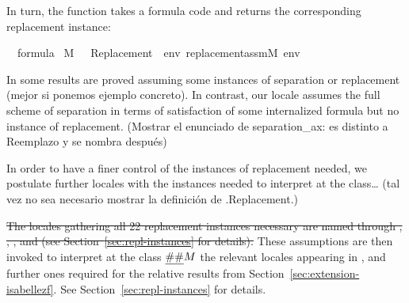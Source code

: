 In turn, the  function
takes a formula code and returns the corresponding replacement
instance:
\begin{isabelle}
{\isasymphi}\ {\isasymin}\ formula\ {\isasymLongrightarrow}\isanewline
{\isacharparenleft}{\kern0pt}M{\isacharcomma}{\kern0pt}\ {\isacharbrackleft}{\kern0pt}{\isacharbrackright}{\kern0pt}\ {\isasymTurnstile}\ {\isasymcdot}Replacement{\isacharparenleft}{\kern0pt}{\isasymphi}{\isacharparenright}{\kern0pt}{\isasymcdot}{\isacharparenright}{\kern0pt}\ {\isasymlongleftrightarrow}\ {\isacharparenleft}{\kern0pt}{\isasymforall}env{\isachardot}{\kern0pt}\ replacement{\isacharunderscore}{\kern0pt}assm{\isacharparenleft}{\kern0pt}M{\isacharcomma}{\kern0pt}\ env{\isacharcomma}{\kern0pt}\ {\isasymphi}{\isacharparenright}{\kern0pt}{\isacharparenright}
\end{isabelle}

In  some results are proved assuming some instances of
separation or replacement (mejor si ponemos ejemplo concreto). In contrast,
our locale  assumes the full scheme of separation in terms
of satisfaction of some internalized formula but no instance of replacement. (Mostrar el enunciado de separation\_ax:
es distinto a Reemplazo y se nombra después)

In order to have a finer control of the instances of replacement needed,
we postulate further locales with the instances needed to interpret at
the class\dots
(tal vez no sea necesario mostrar la definición de .Replacement.)

%

\sout{The locales gathering all 22 replacement instances necessary are named
 through ,
,
, and
 (see
Section~\ref{sec:repl-instances} for details).}
These assumptions are then invoked to interpret at the class
$\isa{\#\#} M$ the relevant locales appearing in
, and further ones required for the relative
results from Section~\ref{sec:extension-isabellezf}. See
Section~\ref{sec:repl-instances} for details.

